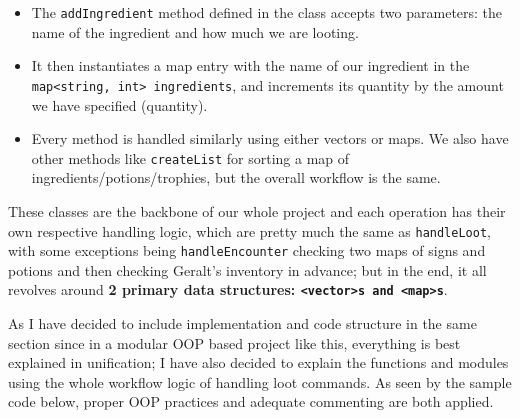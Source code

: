 \documentclass[a4paper,12pt]{article}
\begin{document}
\begin{enumerate}[topsep=0.5ex, partopsep=0pt, parsep=0pt, itemsep=0.5ex]
\begin{itemize}[topsep=0.5ex, partopsep=0pt, parsep=0pt, itemsep=0.5ex]
        \item The \verb|addIngredient| method defined in the class accepts two parameters: the name of the ingredient and how much we are looting.
        \item It then instantiates a map entry with the name of our ingredient in the \verb|map<string, int> ingredients|, and increments its quantity by the amount we have specified (quantity).
        \item Every method is handled similarly using either vectors or maps. We also have other methods like \verb|createList| for sorting a map of ingredients/potions/trophies, but the overall workflow is the same.
    \end{itemize}
\end{enumerate}
These classes are the backbone of our whole project and each operation has their own respective handling logic, which are pretty much the same as \verb|handleLoot|, with some exceptions being \verb|handleEncounter| checking two maps of signs and potions and then checking Geralt’s inventory in advance; but in the end, it all revolves around \textbf{2 primary data structures: \texttt{<vector>s and <map>s}}.

As I have decided to include implementation and code structure in the same section since in a modular OOP based project like this, everything is best explained in unification; I have also decided to explain the functions and modules using the whole workflow logic of handling loot commands. As seen by the sample code below, proper OOP practices and adequate commenting are both applied.
\end{document}
